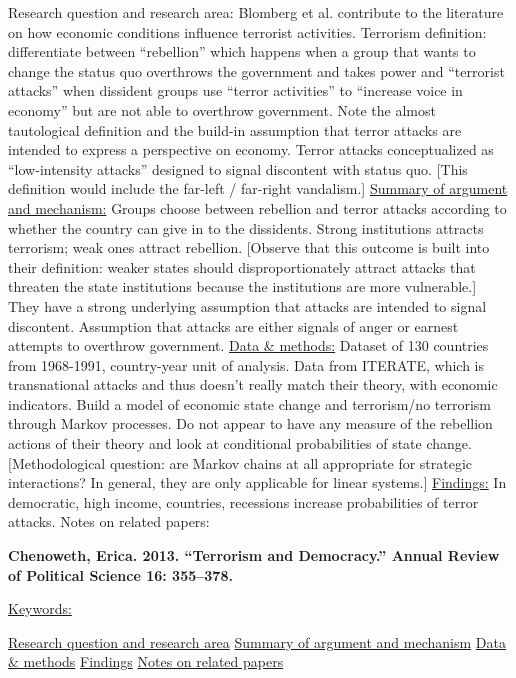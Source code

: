 \documentclass{article}[12pt]
\begin{document}
Research question and research area: Blomberg et al. contribute to the literature on how economic conditions influence terrorist activities.
Terrorism definition: differentiate between ``rebellion'' which happens when a group that wants to change the status quo overthrows the government and takes power and ``terrorist attacks'' when dissident groups use ``terror activities'' to ``increase voice in economy'' but are not able to overthrow government. Note the almost tautological definition and the build-in assumption that terror attacks are intended to express a perspective on economy. Terror attacks conceptualized as ``low-intensity attacks'' designed to signal discontent with status quo. [This definition would include the far-left / far-right vandalism.]
\underline{Summary of argument and mechanism:} Groups choose between rebellion and terror attacks according to whether the country can give in to the dissidents. Strong institutions attracts terrorism; weak ones attract rebellion. [Observe that this outcome is built into their definition: weaker states should disproportionately attract attacks that threaten the state institutions because the institutions are more vulnerable.] They have a strong underlying assumption that attacks are intended to signal discontent. Assumption that attacks are either signals of anger or earnest attempts to overthrow government.
\underline{Data \& methods:} Dataset of 130 countries from 1968-1991, country-year unit of analysis. Data from ITERATE, which is transnational attacks and thus doesn't really match their theory, with economic indicators. Build a model of economic state change and terrorism/no terrorism through Markov processes. Do not appear to have any measure of the rebellion actions of their theory and look at conditional probabilities of state change. [Methodological question: are Markov chains at all appropriate for strategic interactions? In general, they are only applicable for linear systems.]
\underline{Findings:} In democratic, high income, countries, recessions increase probabilities of terror attacks. 
Notes on related papers:


\textbf{Chenoweth, Erica. 2013. “Terrorism and Democracy.” Annual Review of Political Science 16: 355–378.}

\underline{Keywords:}

\underline{Research question and research area}
\underline{Summary of argument and mechanism}
\underline{Data \& methods}
\underline{Findings}
\underline{Notes on related papers}
\end{document}

